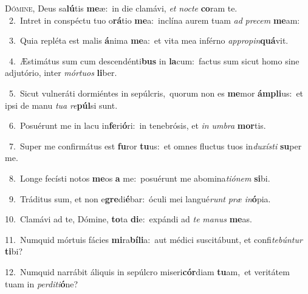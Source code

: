 \lettrine{\initial\textcolor{\initialcolor}{D}}{ómine,} Deus sa\-\textbf{lú}\-tis \textbf{me}\-æ:~\star in die clamávi, \textit{et} \textit{noc}\-\textit{te} \textbf{co}\-ram te.\\
{\numbfont\textcolor{\numbcolor}{~2.}}~Intret in conspéctu tuo o\-\textbf{rá}\-tio \textbf{me}\-a:~\star inclína aurem tuam \textit{ad} \textit{pre}\-\textit{cem} \textbf{me}\-am:\par
{\numbfont\textcolor{\numbcolor}{~3.}}~Quia repléta est malis \textbf{á}\-nima \textbf{me}\-a:~\star et vita mea inférno \textit{ap}\-\textit{pro}\textit{pin}\textbf{quá}vit.\par
{\numbfont\textcolor{\numbcolor}{~4.}}~Æstimátus sum cum descendénti\textbf{bus} in \textbf{la}\-cum:~\star factus sum sicut homo sine adjutório, inter \textit{mór}\-\textit{tu}\textit{os} \textbf{li}\-ber.\par
{\numbfont\textcolor{\numbcolor}{~5.}}~Sicut vulneráti dormiéntes in sepúlcris,~\dagger quorum non es \textbf{me}\-mor \textbf{ám}\-\textbf{pli}us:~\star et ipsi de manu \textit{tu}\-\textit{a} \textit{re}\-\textbf{púl}si sunt.\par
{\numbfont\textcolor{\numbcolor}{~6.}}~Posuérunt me in lacu in\-\textbf{fe}\-ri\-\textbf{ó}\-ri:~\star in tenebrósis, et \textit{in} \textit{um}\-\textit{bra} \textbf{mor}\-tis.\par
{\numbfont\textcolor{\numbcolor}{~7.}}~Super me confirmátus est \textbf{fu}\-ror \textbf{tu}\-us:~\star et omnes fluctus tuos in\-\textit{du}\-\textit{xís}\textit{ti} \textbf{su}\-per me.\par
{\numbfont\textcolor{\numbcolor}{~8.}}~Longe fecísti notos \textbf{me}\-os \textbf{a} me:~\star posuérunt me abomina\-\textit{ti}\-\textit{ó}\textit{nem} \textbf{si}\-bi.\par
{\numbfont\textcolor{\numbcolor}{~9.}}~Tráditus sum, et non e\-\textbf{gre}\-di\-\textbf{é}\-bar:~\star óculi mei langué\textit{runt} \textit{præ} \textit{in}\-\textbf{ó}pia.\par
{\numbfont\textcolor{\numbcolor}{10.}}~Clamávi ad te, Dómine, \textbf{to}\-ta \textbf{di}\-e:~\star expándi ad \textit{te} \textit{ma}\-\textit{nus} \textbf{me}\-as.\par
{\numbfont\textcolor{\numbcolor}{11.}}~Numquid mórtuis fácies \textbf{mi}\-ra\-\textbf{bí}\-\textbf{li}a:~\star aut médici suscitábunt, et confi\-\textit{te}\-\textit{bún}\textit{tur} \textbf{ti}\-bi?\par
{\numbfont\textcolor{\numbcolor}{12.}}~Numquid narrábit áliquis in sepúlcro miseri\-\textbf{cór}\-diam \textbf{tu}\-am,~\star et veritátem tuam in \textit{per}\-\textit{di}\textit{ti}\textbf{ó}ne?\par

